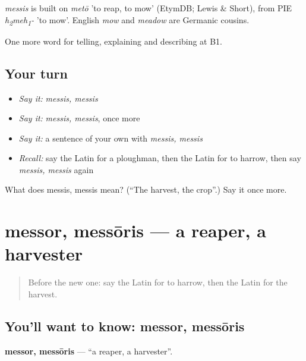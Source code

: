 \begin{cousinweb}
\emph{messis} is built on \emph{metō} 'to reap, to mow' (EtymDB; Lewis \& Short), from PIE \emph{h\textsubscript{2}meh\textsubscript{1}-} 'to mow'. English \emph{mow} and \emph{meadow} are Germanic cousins.
\end{cousinweb}

\begin{grammarlens}[title={What you've built}]
One more word for telling, explaining and describing at B1.
\end{grammarlens}

\subsection*{Your turn}
\begin{itemize}
\raggedright
  \item \emph{Say it:} \emph{messis, messis}
  \item \emph{Say it:} \emph{messis, messis}, once more
  \item \emph{Say it:} a sentence of your own with \emph{messis, messis}
  \item \emph{Recall:} say the Latin for a ploughman, then the Latin for to harrow, then say \emph{messis, messis} again
\end{itemize}

\begin{tcolorbox}[breakable,colback=teal!4,colframe=teal!35!black,title={Before you move on}]
What does messis, messis mean? (\textquotedblleft{}The harvest, the crop\textquotedblright{}.) Say it once more.
\end{tcolorbox}
\section[messor, messōris]{messor, messōris — a reaper, a harvester}

\label{lesson:LA-C475-messor}



\begin{quote}
Before the new one: say the Latin for to harrow, then the Latin for the harvest.
\end{quote}

\subsection*{You'll want to know: messor, messōris}
\textbf{messor, messōris} — \textquotedblleft{}a reaper, a harvester\textquotedblright{}.

